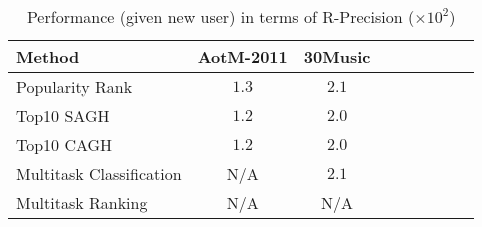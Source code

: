 \begin{table}[!h]
\centering
\caption{Performance (given new user) in terms of R-Precision ($\times 10^2$)}
\label{tab:perf_plgen2_r-precision}
\begin{tabular}{l*{4}{c}*{4}{c}}
\toprule
Method     & AotM-2011 & 30Music \\
\midrule
Popularity Rank &     $1.3$ &   $2.1$ \\
Top10 SAGH &     $1.2$ &   $2.0$ \\
Top10 CAGH &     $1.2$ &   $2.0$ \\
Multitask Classification &       N/A &   $2.1$ \\
Multitask Ranking &       N/A &     N/A \\
\bottomrule
\end{tabular}
\end{table}
